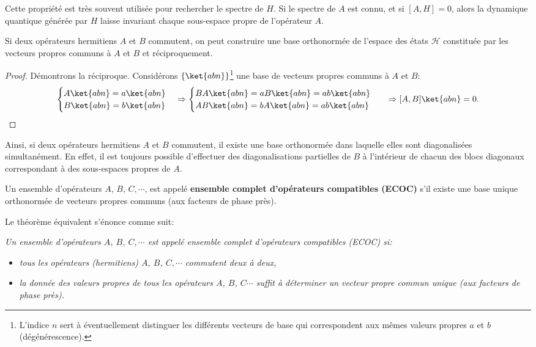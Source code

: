 Cette propriété est très souvent utilisée pour rechercher le spectre de $H$. Si
le spectre de $A$ est connu, et si $[A,H]=0$, alors la dynamique quantique
générée par $H$ laisse invariant chaque sous-espace propre de l'opérateur $A$.

\colorbox[gray]{0.8}{
\parbox[c]{0.9\textwidth}{
\begin{theorem}
\label{th:ECOC1}Si deux opérateurs hermitiens $A$ et $B$ commutent, on peut
construire une base orthonormée de l'espace des états $\mathcal{H}$ constituée
par les vecteurs propres communs à $A$ et $B$ et réciproquement.
\end{theorem}
}}\medskip

\begin{proof}
Démontrons la réciproque. Considérons $\{\ket{abn}\}$\footnote{L'indice $n$ sert
à éventuellement distinguer les différents vecteurs de base qui correspondent
aux mêmes valeurs propres $a$ et $b$ (dégénérescence).} une base de vecteurs
propres communs à $A$ et $B$:%
\begin{align}
\begin{cases}
A\ket{abn}=a\ket{abn}\\
B\ket{abn}=b\ket{abn}
\end{cases}   &  \Rightarrow\begin{cases}
BA\ket{abn}=aB\ket{abn}=ab\ket{abn}\\
AB\ket{abn}=bA\ket{abn}=ab\ket{abn}
\end{cases} &  \Rightarrow[A,B]\ket{abn}=0.
\end{align}
\end{proof}

Ainsi, si deux opérateurs hermitiens $A$ et $B$ commutent, il existe une base
orthonormée dans laquelle elles sont diagonalisées simultanément. En effet, il
est toujours possible d'effectuer des diagonalisations partielles de $B$ à
l'intérieur de chacun des blocs diagonaux correspondant à des sous-espaces
propres de $A$.

\colorbox[gray]{0.8}{
\parbox[c]{0.9\textwidth}{
\begin{theorem}
Un ensemble d'opérateurs $A$, $B$, $C,\cdots$, est appelé \textbf{ensemble
complet d'opérateurs compatibles (ECOC)} s'il existe une base unique orthonormée
de vecteurs propres communs (aux facteurs de phase près).
\end{theorem}
}}\medskip

Le théorème équivalent s'énonce comme suit:

\medskip
\colorbox[gray]{0.8}{
\parbox[c]{0.9\textwidth}{
\emph{Un ensemble d'opérateurs $A$, $B$, $C,\cdots$ est appelé ensemble complet
d'opérateurs compatibles (ECOC) si:}

\begin{itemize}
\item\emph{tous les opérateurs (hermitiens) $A$, $B$, $C,\cdots$ commutent deux
à deux,}

\item\emph{la donnée des valeurs propres de tous les opérateurs $A$, $B$,
$C\cdots$ suffit à déterminer un vecteur propre commun unique (aux facteurs de
phase près).}
\end{itemize}
}}\medskip

